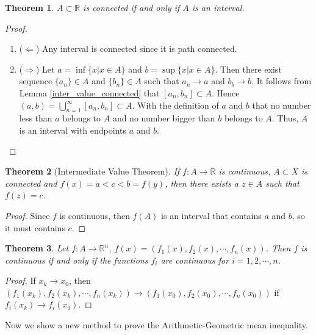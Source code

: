 \documentclass[12pt,leqno]{amsart}
\newtheorem{theorem}{Theorem}[section]
\theoremstyle{definition}
\numberwithin{equation}{subsection}
\begin{document}
\begin{theorem}
$A\subset \mathbb{R}$ is connected if and only if $A$ is an interval.
\end{theorem}
\begin{proof}
~\begin{enumerate}
    \item ($\Leftarrow$) Any interval is connected since it is path connected.
    \item($\Rightarrow$) Let $a = \inf\{x|x\in A\}$ and $b = \sup\{x|x\in A\}$. Then there exist sequence $\{a_n\}\in A$ and $\{b_n\}\in A$ such that $a_n\to a$ and $b_b\to b$. It follows from Lemma \ref{inter_value_connected} that $[a_n, b_n]\subset A$. Hence $(a,b) = \bigcup^\infty_{n=1}[a_n,b_n]\subset A$. With the definition of $a$ and $b$ that no number less than $a$ belongs to $A$ and no number bigger than $b$ belongs to $A$. Thus, $A$ is an interval with endpoints $a$ and $b$.
\end{enumerate}
\end{proof}

\begin{theorem}[Intermediate Value Theorem]
If $f:A\to \mathbb{R}$ is continuous, $A\subset X$ is connected and $f(x) = a < c < b = f(y)$, then there exists a $z\in A$ such that $f(z) = c$.
\end{theorem}
\begin{proof}
Since $f$ is continuous, then $f(A)$ is an interval that contains $a$ and $b$, so it must contains $c$. 
\end{proof}

\begin{theorem}
Let $f:A\to \mathbb{R}^n$, $f(x) = (f_1(x), f_2(x), \cdots, f_n(x))$. Then $f$ is continuous if and only if the functions $f_i$ are continuous for $i = 1,2,\cdots, n$.
\end{theorem}
\begin{proof}
If $x_k\to x_0$, then $(f_1(x_k), f_2(x_k), \cdots, f_n(x_k))\to (f_1(x_0), f_2(x_0), \cdots, f_n(x_0))$ if $f_i(x_k)\to f_i(x_0)$.
\end{proof}

\medskip

Now we show a new method to prove the Arithmetic-Geometric mean inequality.
\end{document}
